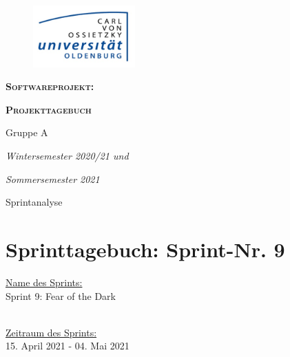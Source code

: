 \documentclass[12pt,a4paper, oneside]{article}
\author{Uni Oldenburg, SWP2020 Gruppe A}
\begin{document}
    \begin{titlepage}
        \pagestyle{empty}
        \begin{center}

            \begin{figure}[h]
                \centering
                \includegraphics[width=0.35\textwidth]{../img/Logo.jpg}
            \end{figure}

            \bigskip \bigskip \noindent
            \textsc{\textbf{\LARGE Softwareprojekt:}} \par \bigskip \noindent
            \textsc{\textbf{\LARGE Projekttagebuch}}


            \par \bigskip \bigskip \bigskip \bigskip \bigskip \noindent
            {\Large Gruppe A} \par \medskip \noindent

            \par \bigskip \bigskip \bigskip \bigskip \bigskip \bigskip \noindent
            \textit{\Large Wintersemester 2020/21 und} \par \noindent
            \textit{\Large Sommersemester 2021}

            \par \bigskip \bigskip \bigskip \bigskip \bigskip \bigskip \noindent
            \par \bigskip \bigskip \bigskip \noindent
            {\Large Sprintanalyse} \par \medskip \noindent

        \end{center}
    \end{titlepage}

    \tableofcontents
    \pagebreak


    \section{Sprinttagebuch: Sprint-Nr. 9}
    \underline{Name des Sprints:}
    \\
    Sprint 9: Fear of the Dark

    \noindent
    \\
    \underline{Zeitraum des Sprints:}
    \\
    15. April 2021 - 04. Mai 2021
\end{document}
